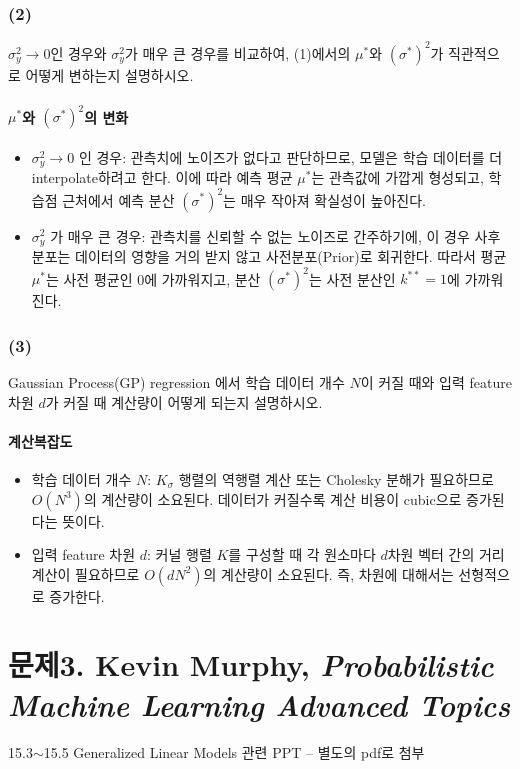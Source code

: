 \documentclass[11pt]{article}
\begin{document}
\subsubsection*{(2)}
$\sigma^2_y \to 0$인 경우와 $\sigma^2_y$가 매우 큰 경우를 비교하여, (1)에서의 $\mu^*$와 $(\sigma^*)^2$가 직관적으로 어떻게 변하는지 설명하시오.
\paragraph{$\mu^*$와 $(\sigma^*)^2$의 변화}
\begin{itemize}
  \item $\sigma_y^2 \to 0$ 인 경우: 관측치에 노이즈가 없다고 판단하므로, 모델은 학습 데이터를 더 interpolate하려고 한다. 이에 따라 예측 평균 $\mu^*$는 관측값에 가깝게 형성되고, 학습점 근처에서 예측 분산 $(\sigma^*)^2$는 매우 작아져 확실성이 높아진다.
  \item $\sigma_y^2$ 가 매우 큰 경우: 관측치를 신뢰할 수 없는 노이즈로 간주하기에, 이 경우 사후분포는 데이터의 영향을 거의 받지 않고 사전분포(Prior)로 회귀한다. 따라서 평균 $\mu^*$는 사전 평균인 0에 가까워지고, 분산 $(\sigma^*)^2$는 사전 분산인 $k^{**}=1$에 가까워진다.
\end{itemize}

\subsubsection*{(3)}
Gaussian Process(GP) regression 에서 학습 데이터 개수 $N$이 커질 때와 입력 feature 차원 $d$가 커질 때 계산량이 어떻게 되는지 설명하시오.
\paragraph{계산복잡도}
\begin{itemize}
    \item 학습 데이터 개수 $N$: $K_\sigma$ 행렬의 역행렬 계산 또는 Cholesky 분해가 필요하므로 $O(N^3)$의 계산량이 소요된다. 데이터가 커질수록 계산 비용이 cubic으로 증가된다는 뜻이다.
    \item 입력 feature 차원 $d$: 커널 행렬 $K$를 구성할 때 각 원소마다 $d$차원 벡터 간의 거리 계산이 필요하므로 $O(dN^2)$의 계산량이 소요된다. 즉, 차원에 대해서는 선형적으로 증가한다.
\end{itemize}

\vspace{\bigskip}
\section*{문제3. Kevin Murphy, \textit{Probabilistic Machine Learning Advanced Topics}}

15.3$\sim$15.5 Generalized Linear Models 관련 PPT -- 별도의 pdf로 첨부

    
\end{document}
